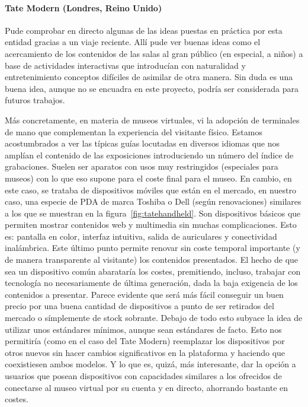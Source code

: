 \paragraph{Tate Modern (Londres, Reino Unido)}
\par Pude comprobar en directo algunas de las ideas puestas en práctica por esta entidad gracias a un viaje reciente. Allí pude ver buenas ideas como el acercamiento de los contenidos de las salas al gran público (en especial, a niños) a base de actividades interactivas que introducían con naturalidad y entretenimiento conceptos difíciles de asimilar de otra manera. Sin duda es una buena idea, aunque no se encuadra en este proyecto, podría ser considerada para futuros trabajos. 
\par Más concretamente, en materia de museos virtuales, vi la adopción de terminales de mano que complementan la experiencia del visitante físico. Estamos acostumbrados a ver las típicas guías locutadas en diversos idiomas que nos amplían el contenido de las exposiciones introduciendo un número del índice de grabaciones. Suelen ser aparatos con usos muy restringidos (especiales para museos) con lo que eso supone para el coste final para el museo. En cambio, en este caso, se trataba de dispositivos móviles que están en el mercado, en nuestro caso, una especie de PDA de marca Toshiba o Dell (según renovaciones) similares a los que se muestran en la figura~\ref{fig:tatehandheld}. Son dispositivos básicos que permiten mostrar contenidos web y multimedia sin muchas complicaciones. Esto es: pantalla en color, interfaz intuitiva, salida de auriculares y conectividad inalámbrica. Este último punto permite renovar sin coste temporal importante (y de manera transparente al visitante) los contenidos presentados. El hecho de que sea un dispositivo común abarataría los costes, premitiendo, incluso, trabajar con tecnología no necesariamente de última generación, dada la baja exigencia de los contenidos a presentar. Parece evidente que será más fácil conseguir un buen precio por una buena cantidad de dispositivos a punto de ser retirados del mercado o símplemente de stock sobrante.
Debajo de todo esto subyace la idea de utilizar unos estándares mínimos, aunque sean estándares de facto. Esto nos permitiría (como en el caso del Tate Modern) reemplazar los dispositivos por otros nuevos sin hacer cambios significativos en la plataforma y haciendo que coexistiesen ambos modelos. Y lo que es, quizá, más interesante, dar la opción a usuarios que posean dispositivos con capacidades similares a los ofrecidos de conectarse al museo virtual por su cuenta y en directo, ahorrando bastante en costes.

